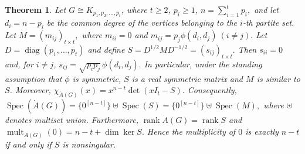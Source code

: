 \documentclass[12pt,twoside]{article}
\newcommand{\spec}{\operatorname{Spec}}
\newtheorem{theorem}{Theorem}[section]
\begin{document}
\begin{theorem}\label{thm:spectrum_complete_multipartite_updated}
	Let $G\cong K_{p_1,p_2,\ldots,p_t}$, where $t\geq 2$, $p_i\geq 1$,
	$
	n=\sum_{i=1}^t p_i,
	$
	and let
	$
	d_i=n-p_i
	$
	be the common degree of the vertices belonging to the $i$-th partite set. Let
	$
	M=(m_{ij})_{t\times t},
	$
	where
	$
	m_{ii}=0
	$
	and
	$
	m_{ij}=p_j\phi(d_i,d_j)~
	 (i\neq j).	$
	Let
	$
	D=\operatorname{diag}(p_1,\ldots,p_t)
	$
	and define
	$
	S=D^{1/2}MD^{-1/2}=(s_{ij})_{t\times t}.
	$
	Then
	$
	s_{ii}=0
	$
	and, for $i\neq j$,
	$
	s_{ij}=\sqrt{p_ip_j}\,\phi(d_i,d_j).
	$
	In particular, under the standing assumption that $\phi$ is symmetric, $S$ is a real symmetric matrix and $M$ is similar to $S$. Moreover,
	$
	\chi_{\dot A(G)}(x)
	=
	x^{n-t}\det(xI_t-S).
	$
	Consequently,
	$
	\spec(\dot A(G))
	=
	\{0^{[n-t]}\}\uplus\spec(S)
	=
	\{0^{[n-t]}\}\uplus\spec(M),
	$
	where $\uplus$ denotes multiset union. Furthermore,
	$
	\operatorname{rank}\dot A(G)
	=
	\operatorname{rank}S
	$
	and
	$
	\operatorname{mult}_{\dot A(G)}(0)
	=
	n-t+\dim\ker S.
	$
	Hence the multiplicity of $0$ is exactly $n-t$ if and only if $S$ is nonsingular.
\end{theorem}
\end{document}
